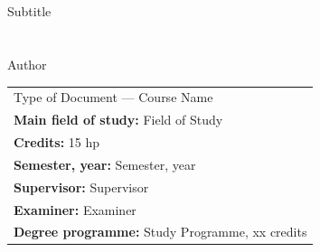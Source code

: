   
  \begin{titlepage}
  \setlength\headheight{59pt}
  \renewcommand{\headrulewidth}{0pt}
  \thispagestyle{fancy}
  \fancyhf{}
  \fancyfoot{}
    \vspace*{0.5cm}
    {
      \\
      \\
      \large{Subtitle}
    \\
    \\
    \\
    	\large{Author}}
    \vspace*{13cm}

    \renewcommand{\arraystretch}{0.5}
    \begin{tabular}{l}
      \footnotesize{Type of Document --- Course Name}\\
      \footnotesize{\textbf{Main field of study:} Field of Study}\\
      \footnotesize{\textbf{Credits:} 15 hp}\\
      \footnotesize{\textbf{Semester, year:} Semester, year}\\
      \footnotesize{\textbf{Supervisor:} Supervisor}\\
      \footnotesize{\textbf{Examiner:} Examiner}\\
      \footnotesize{\textbf{Degree programme:} Study Programme, xx credits}\\
    \end{tabular}
  \end{titlepage}

